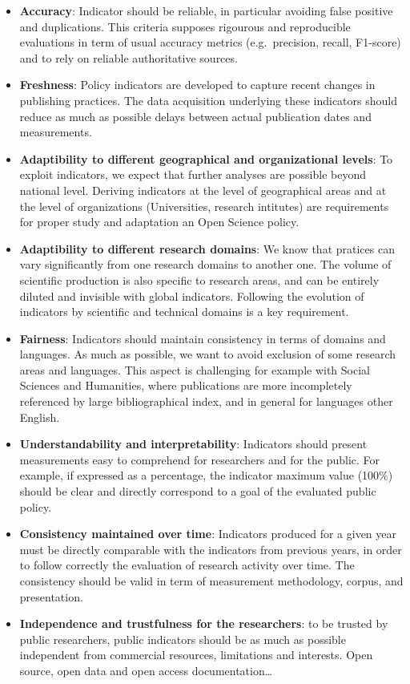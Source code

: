 \documentclass[
]{article}
\begin{document}
\begin{itemize}
\item
  \textbf{Accuracy}: Indicator should be reliable, in particular
  avoiding false positive and duplications. This criteria supposes
  rigourous and reproducible evaluations in term of usual accuracy
  metrics (e.g.~precision, recall, F1-score) and to rely on reliable
  authoritative sources.
\item
  \textbf{Freshness}: Policy indicators are developed to capture recent
  changes in publishing practices. The data acquisition underlying these
  indicators should reduce as much as possible delays between actual
  publication dates and measurements.
\item
  \textbf{Adaptibility to different geographical and organizational
  levels}: To exploit indicators, we expect that further analyses are
  possible beyond national level. Deriving indicators at the level of
  geographical areas and at the level of organizations (Universities,
  research intitutes) are requirements for proper study and adaptation
  an Open Science policy.
\item
  \textbf{Adaptibility to different research domains}: We know that
  pratices can vary significantly from one research domains to another
  one. The volume of scientific production is also specific to research
  areas, and can be entirely diluted and invisible with global
  indicators. Following the evolution of indicators by scientific and
  technical domains is a key requirement.
\item
  \textbf{Fairness}: Indicators should maintain consistency in terms of
  domains and languages. As much as possible, we want to avoid exclusion
  of some research areas and languages. This aspect is challenging for
  example with Social Sciences and Humanities, where publications are
  more incompletely referenced by large bibliographical index, and in
  general for languages other English.
\item
  \textbf{Understandability and interpretability}: Indicators should
  present measurements easy to comprehend for researchers and for the
  public. For example, if expressed as a percentage, the indicator
  maximum value (100\%) should be clear and directly correspond to a
  goal of the evaluated public policy.
\item
  \textbf{Consistency maintained over time}: Indicators produced for a
  given year must be directly comparable with the indicators from
  previous years, in order to follow correctly the evaluation of
  research activity over time. The consistency should be valid in term
  of measurement methodology, corpus, and presentation.
\item
  \textbf{Independence and trustfulness for the researchers}: to be
  trusted by public researchers, public indicators should be as much as
  possible independent from commercial resources, limitations and
  interests. Open source, open data and open access
  documentation\ldots{}
\end{itemize}
\end{document}
